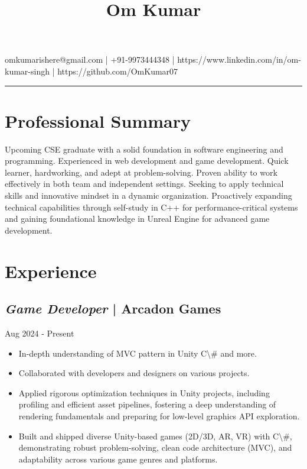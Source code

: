 \documentclass{article}%
\title{Om Kumar}%
\author{}%
\date{}%
\begin{document}
%
\normalsize%
\maketitle%
\centering%
omkumarishere@gmail.com | +91-9973444348 | https://www.linkedin.com/in/om-kumar-singh | https://github.com/OmKumar07%
\hrule%
\vspace{1em}%
\section*{Professional Summary}%
\label{sec:ProfessionalSummary}%
Upcoming CSE graduate with a solid foundation in software engineering and programming. Experienced in web development and game development. Quick learner, hardworking, and adept at problem-solving. Proven ability to work effectively in both team and independent settings. Seeking to apply technical skills and innovative mindset in a dynamic organization. Proactively expanding technical capabilities through self-study in C++ for performance-critical systems and gaining foundational knowledge in Unreal Engine for advanced game development.

%
\section*{Experience}%
\label{sec:Experience}%
\subsection*{\textit{Game Developer} | Arcadon Games}%
\label{subsec:textitGameDeveloper|ArcadonGames}%
\hfill%
Aug 2024 - Present%
\begin{itemize}%
\item%
In-depth understanding of MVC pattern in Unity C\textbackslash{}# and more.%
\item%
Collaborated with developers and designers on various projects.%
\item%
Applied rigorous optimization techniques in Unity projects, including profiling and efficient asset pipelines, fostering a deep understanding of rendering fundamentals and preparing for low-level graphics API exploration.%
\item%
Built and shipped diverse Unity-based games (2D/3D, AR, VR) with C\textbackslash{}#, demonstrating robust problem-solving, clean code architecture (MVC), and adaptability across various game genres and platforms.%
\end{itemize}
\end{document}
